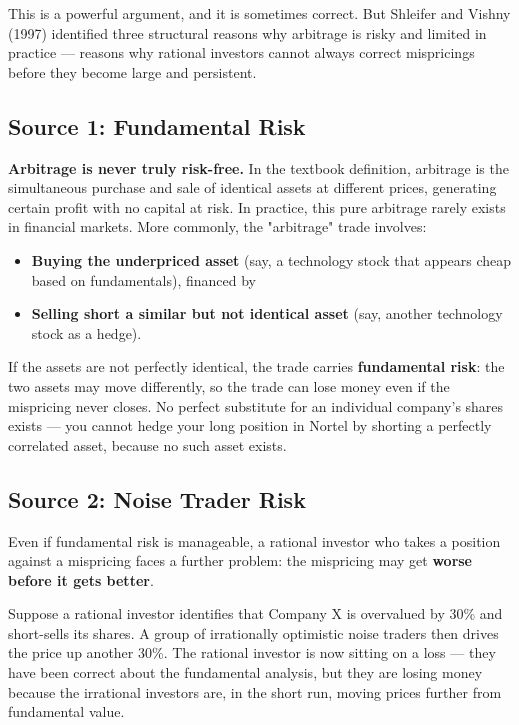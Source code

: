 \documentclass[12pt, letterpaper]{article}
\begin{document}
This is a powerful argument, and it is sometimes correct. But Shleifer and Vishny (1997) identified three structural reasons why arbitrage is risky and limited in practice --- reasons why rational investors cannot always correct mispricings before they become large and persistent.


\subsection{Source 1: Fundamental Risk}


\textbf{Arbitrage is never truly risk-free.} In the textbook definition, arbitrage is the simultaneous purchase and sale of identical assets at different prices, generating certain profit with no capital at risk. In practice, this pure arbitrage rarely exists in financial markets. More commonly, the "arbitrage" trade involves:
\begin{itemize}
\item \textbf{Buying the underpriced asset} (say, a technology stock that appears cheap based on fundamentals), financed by
\item \textbf{Selling short a similar but not identical asset} (say, another technology stock as a hedge).
\end{itemize}

If the assets are not perfectly identical, the trade carries \textbf{fundamental risk}: the two assets may move differently, so the trade can lose money even if the mispricing never closes. No perfect substitute for an individual company's shares exists --- you cannot hedge your long position in Nortel by shorting a perfectly correlated asset, because no such asset exists.


\subsection{Source 2: Noise Trader Risk}


Even if fundamental risk is manageable, a rational investor who takes a position against a mispricing faces a further problem: the mispricing may get \textbf{worse before it gets better}.

Suppose a rational investor identifies that Company X is overvalued by 30\% and short-sells its shares. A group of irrationally optimistic noise traders then drives the price up another 30\%. The rational investor is now sitting on a loss --- they have been correct about the fundamental analysis, but they are losing money because the irrational investors are, in the short run, moving prices further from fundamental value.
\end{document}
